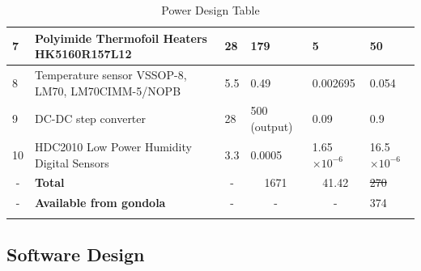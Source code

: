 \documentclass[a4paper,12pt,twoside]{article}
\providecommand{\DIFaddtex}[1]{{\protect\color{blue}\uwave{#1}}} %
\providecommand{\DIFdeltex}[1]{{\protect\color{red}\sout{#1}}}                      %
\providecommand{\DIFaddbegin}{} %
\providecommand{\DIFaddend}{} %
\providecommand{\DIFdelbegin}{} %
\providecommand{\DIFdelend}{} %
\providecommand{\DIFadd}[1]{\texorpdfstring{\DIFaddtex{#1}}{#1}} %
\providecommand{\DIFdel}[1]{\texorpdfstring{\DIFdeltex{#1}}{}} %
\newcommand{\DIFscaledelfig}{0.5}
\newlength{\DIFdelgraphicswidth} %
\newlength{\DIFdelgraphicsheight} %
\newcommand{\DIFaddincludegraphics}[2][]{{\color{blue}\fbox{\DIFOincludegraphics[#1]{#2}}}} %
\newcommand{\DIFdelincludegraphics}[2][]{%
\sbox{\DIFdelgraphicsbox}{\DIFOincludegraphics[#1]{#2}}%
\settoboxwidth{\DIFdelgraphicswidth}{\DIFdelgraphicsbox} %
\settoboxtotalheight{\DIFdelgraphicsheight}{\DIFdelgraphicsbox} %
\scalebox{\DIFscaledelfig}{%
\parbox[b]{\DIFdelgraphicswidth}{\usebox{\DIFdelgraphicsbox}\\[-\baselineskip] \rule{\DIFdelgraphicswidth}{0em}}\llap{\resizebox{\DIFdelgraphicswidth}{\DIFdelgraphicsheight}{%
\setlength{\unitlength}{\DIFdelgraphicswidth}%
\begin{picture}(1,1)%
\thicklines\linethickness{2pt} %
{\color[rgb]{1,0,0}\put(0,0){\framebox(1,1){}}}%
{\color[rgb]{1,0,0}\put(0,0){\line( 1,1){1}}}%
{\color[rgb]{1,0,0}\put(0,1){\line(1,-1){1}}}%
\end{picture}%
}\hspace*{3pt}}} %
} %
\DeclareRobustCommand{\DIFaddbegin}{\DIFOaddbegin \let\includegraphics\DIFaddincludegraphics} %
\DeclareRobustCommand{\DIFaddend}{\DIFOaddend \let\includegraphics\DIFOincludegraphics} %
\DeclareRobustCommand{\DIFdelbegin}{\DIFOdelbegin \let\includegraphics\DIFdelincludegraphics} %
\DeclareRobustCommand{\DIFdelend}{\DIFOaddend \let\includegraphics\DIFOincludegraphics} %
\begin{document}
\begin{longtable}{|m{}| m{} |m{} |m{}|m{}| m{} |}
7                       & Polyimide Thermofoil Heaters HK5160R157L12        & 28                                          & 179                                          & 5                                         & 50                                         \\ \hline
8                       & Temperature sensor VSSOP-8, LM70, LM70CIMM-5/NOPB & 5.5                                         & 0.49                                         & 0.002695                                  & 0.054                                      \\ \hline
9                       & DC-DC step converter                              & 28                                          & 500 (output)                                 & 0.09                                      & 0.9                                        \\ \hline
10                      & HDC2010 Low Power Humidity Digital Sensors        & 3.3                                         & 0.0005                                       & 1.65$\times10^{-6}$                              & 16.5$\times10^{-6}$                               \\ \hline
\multicolumn{1}{|c|}{-} & \textbf{Total}                                  & \multicolumn{1}{c|}{-}                      & \DIFdelbegin %
\DIFdelend \DIFaddbegin \multicolumn{1}{c|}{1671}                    \DIFaddend & \DIFdelbegin %
\DIFdelend \DIFaddbegin \multicolumn{1}{c|}{41.42}                 \DIFaddend & \DIFdelbegin \DIFdel{270                                        }\DIFdelend \DIFaddbegin \DIFadd{267                                        }\DIFaddend \\ \hline
\multicolumn{1}{|c|}{-} & \textbf{Available from gondola}                 & \multicolumn{1}{c|}{-}                      & \multicolumn{1}{c|}{-}                       & \multicolumn{1}{c|}{-}                    & 374                                        \\ \hline

\caption{Power Design Table}
\label{tab:power-design-table}
\end{longtable}
\raggedbottom



\raggedbottom

\pagebreak
\subsection{Software Design}
\end{document}
